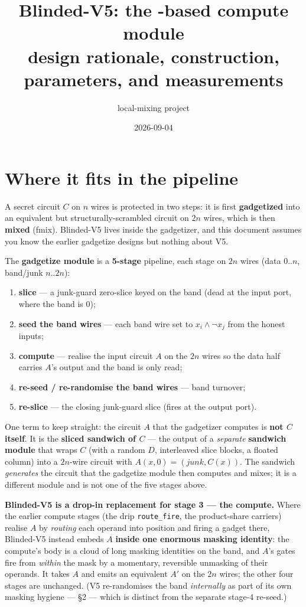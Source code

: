 \documentclass[11pt]{article}
\title{Blinded-V5: the \lgi-based compute module\\
  \large design rationale, construction, parameters, and measurements}
\author{local-mixing project}
\date{2026-09-04}
\newcommand{\doc}[1]{\texttt{#1}}
\begin{document}
\maketitle

\section*{Where it fits in the pipeline}

A secret circuit $C$ on $n$ wires is protected in two steps: it is first
\textbf{gadgetized} into an equivalent but structurally-scrambled circuit on $2n$
wires, which is then \textbf{mixed} (fmix). Blinded-V5 lives inside the
gadgetizer, and this document assumes you know the earlier gadgetize designs but
nothing about V5.

The \textbf{gadgetize module} is a \textbf{5-stage} pipeline, each stage on $2n$
wires (data $0..n$, band/junk $n..2n$):

\begin{enumerate}
\item \textbf{slice} --- a junk-guard zero-slice keyed on the band (dead at the
  input port, where the band is 0);
\item \textbf{seed the band wires} --- each band wire set to $x_i \land \lnot x_j$
  from the honest inputs;
\item \textbf{compute} --- realise the input circuit $A$ on the $2n$ wires so the
  data half carries $A$'s output and the band is only read;
\item \textbf{re-seed / re-randomise the band wires} --- band turnover;
\item \textbf{re-slice} --- the closing junk-guard slice (fires at the output
  port).
\end{enumerate}

One term to keep straight: the circuit $A$ that the gadgetizer computes is
\textbf{not $C$ itself}. It is the \textbf{sliced sandwich of $C$} --- the output
of a \emph{separate} \textbf{sandwich module} that wraps $C$ (with a random $D$,
interleaved slice blocks, a floated column) into a $2n$-wire circuit with
$A(x,0) = (\mathit{junk}, C(x))$. The sandwich \emph{generates} the circuit that
the gadgetize module then computes and mixes; it is a different module and is not
one of the five stages above.

\textbf{Blinded-V5 is a drop-in replacement for stage 3 --- the compute.} Where
the earlier compute stages (the drip \doc{route\_fire}, the product-share
carriers) realise $A$ by \emph{routing} each operand into position and firing a
gadget there, Blinded-V5 instead embeds $A$ \textbf{inside one enormous masking
identity}: the compute's body is a cloud of long masking identities on the band,
and $A$'s gates fire from \emph{within} the mask by a momentary, reversible
unmasking of their operands. It takes $A$ and emits an equivalent $A'$ on the $2n$
wires; the other four stages are unchanged. (V5 re-randomises the band
\emph{internally} as part of its own masking hygiene --- \S2 --- which is distinct
from the separate stage-4 re-seed.)
\end{document}
